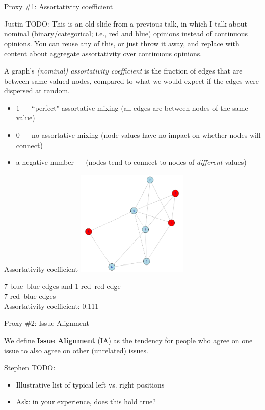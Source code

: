 \documentclass[12pt]{beamer}
\begin{document}
\begin{frame}[c]{Proxy \#1: Assortativity coefficient} %

{\tiny \color{red} Justin TODO: This is an old slide from a previous talk, in which I talk
about nominal (binary/categorical; i.e., red and blue) opinions instead of
continuous opinions. You can reuse any of this, or just throw it away, and
replace with content about aggregate assortativity over continuous opinions.}

A graph's \textit{(nominal) assortativity coefficient} is the fraction of
edges that are between same-valued nodes, compared to what we would expect if
the edges were dispersed at random.

\begin{itemize}
\itemsep.1em
\item 1 --- ``perfect" assortative mixing (all edges are between nodes of the
same value)
\item 0 --- no assortative mixing (node values have no impact on whether nodes
will connect)
\item a negative number --- (nodes tend to connect to nodes of
\textit{different} values)

\end{itemize}

\end{frame}

\begin{frame}[c]{Assortativity coefficient} %
\centering
\includegraphics[width=0.4\textwidth]{assortativityGraph.png}

7 blue--blue edges and 1 red--red edge\\
7 red--blue edges\\
Assortativity coefficient: 0.111

\end{frame}


\begin{frame}[c]{Proxy \#2: Issue Alignment} %

We define \textbf{Issue Alignment} (IA) as the tendency for people who agree on
one issue to also agree on other (unrelated) issues.

{\tiny \color{red} 
Stephen TODO:

\begin{itemize}
\itemsep.1em
\item Illustrative list of typical left vs. right positions
\item Ask: in your experience, does this hold true?
\end{itemize}
}

\end{frame}
\end{document}
